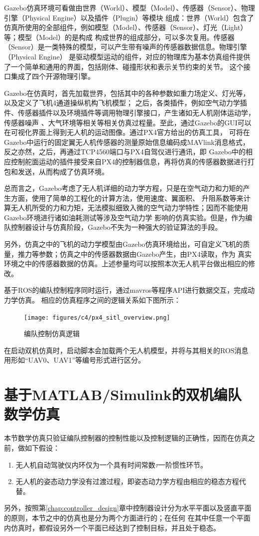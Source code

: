 Gazebo仿真环境可看做由世界（World）、模型（Model）、传感器（Sensor）、物理引擎（Physical Engine）以及插件（Plugin）等模块
组成：世界（World）包含了仿真所使用的全部组件，例如模型（Model）、传感器（Sensor）、灯光（Light）等；模型（Model）的是构成
构成世界的组成部分，可以多次复用。传感器（Sensor）是一类特殊的模型，可以产生带有噪声的传感器数据信息。物理引擎（Physical Engine）
是驱动模型运动的组件，对应的物理库为基本仿真组件提供了一个简单和通用的界面，包括刚体、碰撞形状和表示关节约束的关节。
这个接口集成了四个开源物理引擎。

Gazebo在仿真时，首先加载世界，包括其中的各种参数如重力场定义、灯光等，以及定义了飞机4通道操纵机构飞机模型；
之后，各类插件，例如空气动力学插件、传感器插件以及环境插件等调用物理引擎接口，产生诸如无人机刚体运动学，传感器噪声
、大气环境等相关等相关仿真过程量。至此，通过Gazebo的GUI可以在可视化界面上得到无人机的运动图像。通过PX4官方给出的仿真工具，
可将在Gazebo中运行的固定翼无人机传感器的测量原始信息编码成MAVlink消息格式，反之亦然，之后，再通过TCP4560端口与PX4自驾仪进行通讯，即
Gazebo中的相应控制舵面运动的插件接受来自PX4的控制器信息，再将仿真的传感器数据进行打包和发送，从而构成了仿真环境。

总而言之，Gazebo考虑了无人机详细的动力学方程，只是在空气动力和力矩的产生方面，使用了简单的工程化的计算方法，使用速度、翼面积、
升阻系数等来计算无人机所受的力和力矩，无法模拟细致入微的空气动力学特性；因而不能使用Gazebo环境进行诸如油耗测试等涉及空气动力学
影响的仿真实验。但是，作为编队控制器设计与仿真阶段，Gazebo不失为一种强大的验证算法的手段。

另外，仿真之中的飞机的动力学模型由Gazebo仿真环境给出，可自定义飞机的质量，推力等参数；仿真之中的传感器数据由Gazebo产生，由PX4读取，作为
真实环境之中的传感器数据的仿真。上述参量均可以按照本次无人机平台做出相应的修改。

基于ROS的编队控制程序同时运行，通过mavros等程序API进行数据交互，完成动力学仿真。
相应的仿真程序之间的逻辑关系如下图所示：
\begin{figure}[H]
    \centering
    \texttt{[image: figures/c4/px4\_sitl\_overview.png]}
    \caption{编队控制仿真逻辑}\label{fig:px4_sitl_overview}
\end{figure}
在启动双机仿真时，启动脚本会加载两个无人机模型，并将与其相关的ROS消息用形如“UAV0、UAV1”等编号形式进行区分。
\section{基于MATLAB/Simulink的双机编队数学仿真}
本节数学仿真只验证编队控制器的控制性能以及控制逻辑的正确性，因而在仿真之前，做如下假设：
\begin{enumerate}
\item 无人机自动驾驶仪内环仅为一个具有时间常数$\tau$一阶惯性环节。
\item 无人机的姿态动力学没有过渡过程，即姿态动力学方程由相应的稳态方程代替。
\end{enumerate}
另外，按照第\ref{chap:controller_design}章中控制器设计分为水平平面以及竖直平面的原则，本节之中的仿真也是分为两个方面进行的；在任何
在其中任意一个平面内仿真时，都假设另外一个平面已经达到了控制目标，并且处于稳态。

